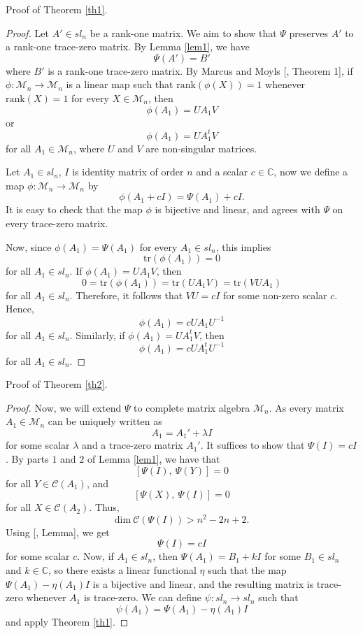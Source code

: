 \documentclass{amsart}
\theoremstyle{definition}
\theoremstyle{remark}
\numberwithin{equation}{section}
\begin{document}
Proof of Theorem \ref{th1}.
\begin{proof}
	Let $A' \in sl_n$ be a rank-one matrix. We aim to show that $\Psi$ preserves $A'$ to a rank-one trace-zero matrix. By Lemma \ref{lem1}, we have $$\Psi(A')=B'$$ where $B'$ is a rank-one trace-zero matrix. By Marcus and Moyls [\cite{Mar}, Theorem 1], if $\phi: \mathscr{M}_n \to \mathscr{M}_n$ is a linear map such that $\text{rank}(\phi(X))=1$ whenever $\text{rank}(X)=1$ for every $X \in \mathscr{M}_n$, then $$\phi(A_1)=UA_1V$$ or $$\phi(A_1)=UA_1^tV$$ for all $A_1 \in \mathscr{M}_n$, where $U$ and $V$ are non-singular matrices.

    Let $A_1 \in sl_n$, $I$ is identity matrix of order $n$ and a scalar $c \in \mathbb{C}$, now we define a map $\phi: \mathscr{M}_n \to \mathscr{M}_n$ by $$\phi(A_1+cI)=\Psi(A_1)+cI.$$ It is easy to check that the map $\phi$ is bijective and linear, and agrees with $\Psi$ on every trace-zero matrix. 

    Now, since $\phi(A_1)=\Psi(A_1)$ for every $A_1 \in sl_n$, this implies $$\text{tr}(\phi(A_1))=0$$ for all $A_1 \in sl_n$. If $\phi(A_1)=UA_1V$, then $$0=\text{tr}(\phi(A_1))=\text{tr}(UA_1V)=\text{tr}(VUA_1)$$ for all $A_1\in sl_n$. Therefore, it follows that $VU=cI$ for some non-zero scalar $c$. Hence, $$\phi(A_1)=cUA_1U^{-1}$$ for all $A_1 \in sl_n$. Similarly, if $\phi(A_1)=UA_1^tV$, then $$\phi(A_1)=cUA_1^tU^{-1}$$ for all $A_1 \in sl_n$.
\end{proof}
Proof of Theorem \ref{th2}.
\begin{proof}
	Now, we will extend $\Psi$ to complete matrix algebra $\mathscr{M}_n$. As every matrix $A_1 \in \mathscr{M}_n$ can be uniquely written as $$A_1 = A_1' + \lambda I$$ for some scalar $\lambda$ and a trace-zero matrix $A_1'$. 
    It suffices to show that $\Psi(I)=cI$. By parts $1$ and $2$ of Lemma \ref{lem1}, we have that $$[\Psi(I),~\Psi(Y)]=0$$ for all $Y \in \mathcal{C}(A_1)$, and $$[\Psi(X),~\Psi(I)]=0$$ for all $X \in \mathcal{C}(A_2)$. Thus, $$\text{dim}~\mathcal{C}(\Psi(I)) > n^2-2n+2.$$ Using [\cite{wat}, Lemma], we get $$\Psi(I)=cI$$ for some scalar $c$.
    Now, if $A_1 \in sl_n$, then $\Psi(A_1)=B_1+k I$ for some $B_1 \in sl_n$ and $k \in \mathbb{C}$, so there exists a linear functional $\eta$ such that the map $\Psi(A_1)-\eta(A_1)I$ is a bijective and linear, and the resulting matrix is trace-zero whenever $A_1$ is trace-zero. We can define $\psi: sl_n \to sl_n$ such that $$\psi(A_1)=\Psi(A_1)-\eta(A_1)I$$ and apply Theorem \ref{th1}.
\end{proof}
\end{document}
